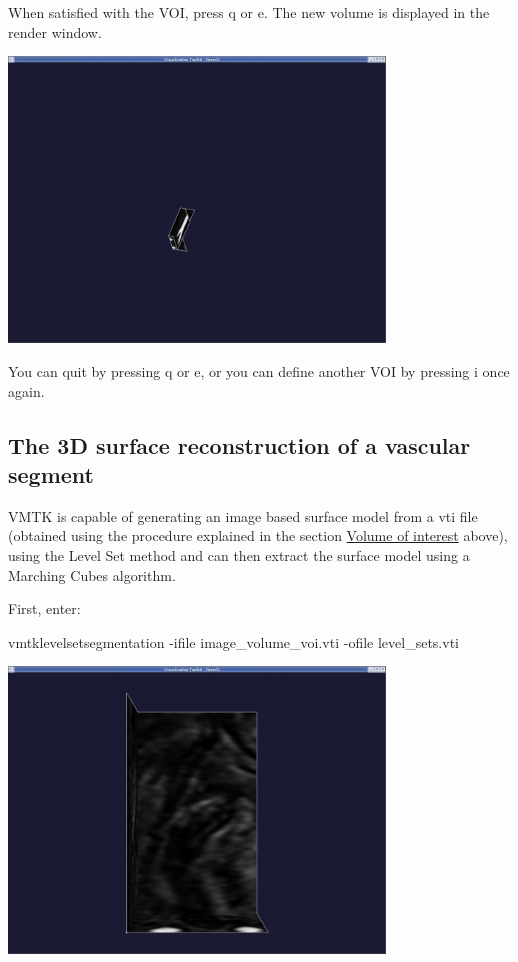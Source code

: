 When satisfied with the V\+OI, press {\ttfamily q} or {\ttfamily e}. The new volume is displayed in the render window.

 
\begin{DoxyImageNoCaption}
  \mbox{\includegraphics[width=0.75\textwidth]{voi}}
\end{DoxyImageNoCaption}


You can quit by pressing {\ttfamily q} or {\ttfamily e}, or you can define another V\+OI by pressing {\ttfamily i} once again.



 

\hypertarget{index_surface}{}\subsection{The 3\+D surface reconstruction of a vascular segment}\label{index_surface}
V\+M\+TK is capable of generating an image based surface model from a {\ttfamily vti} file (obtained using the procedure explained in the section \hyperlink{index_voi}{Volume of interest} above), using the Level Set method and can then extract the surface model using a Marching Cubes algorithm.

First, enter\+: 
\begin{DoxyCode}
vmtklevelsetsegmentation -ifile image\_volume\_voi.vti -ofile level\_sets.vti
\end{DoxyCode}


 
\begin{DoxyImageNoCaption}
  \mbox{\includegraphics[width=0.75\textwidth]{voi_display}}
\end{DoxyImageNoCaption}


